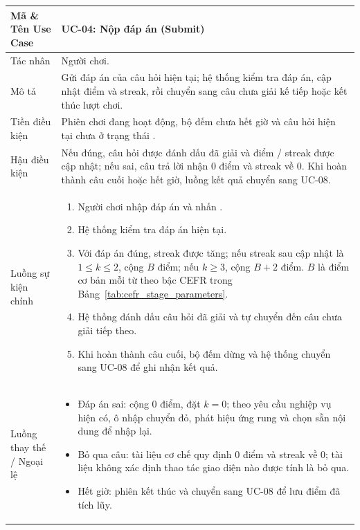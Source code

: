 \begin{xltabular}{\textwidth}{|L{3.3cm}|Y|}
\textbf{Mã \& Tên Use Case} & \textbf{UC-04: Nộp đáp án (Submit)} \\ \hline
Tác nhân & Người chơi. \\ \hline
Mô tả & Gửi đáp án của câu hỏi hiện tại; hệ thống kiểm tra đáp án, cập nhật điểm và streak, rồi chuyển sang câu chưa giải kế tiếp hoặc kết thúc lượt chơi. \\ \hline
Tiền điều kiện & Phiên chơi đang hoạt động, bộ đếm chưa hết giờ và câu hỏi hiện tại chưa ở trạng thái . \\ \hline
Hậu điều kiện & Nếu đúng, câu hỏi được đánh dấu đã giải và điểm / streak được cập nhật; nếu sai, câu trả lời nhận 0 điểm và streak về 0. Khi hoàn thành câu cuối hoặc hết giờ, luồng kết quả chuyển sang UC-08. \\ \hline
Luồng sự kiện chính &
\begin{enumerate}[nosep,leftmargin=*]
    \item Người chơi nhập đáp án và nhấn .
    \item Hệ thống kiểm tra đáp án hiện tại.
    \item Với đáp án đúng, streak được tăng; nếu streak sau cập nhật là \(1 \le k \le 2\), cộng \(B\) điểm; nếu \(k \ge 3\), cộng \(B+2\) điểm. \(B\) là điểm cơ bản mỗi từ theo bậc CEFR trong Bảng~\ref{tab:cefr_stage_parameters}.
    \item Hệ thống đánh dấu câu hỏi đã giải và tự chuyển đến câu chưa giải tiếp theo.
    \item Khi hoàn thành câu cuối, bộ đếm dừng và hệ thống chuyển sang UC-08 để ghi nhận kết quả.
\end{enumerate} \\ \hline
Luồng thay thế / Ngoại lệ &
\begin{itemize}[nosep,leftmargin=*]
    \item Đáp án sai: cộng 0 điểm, đặt \(k=0\); theo yêu cầu nghiệp vụ hiện có, ô nhập chuyển đỏ, phát hiệu ứng rung và chọn sẵn nội dung để nhập lại.
    \item Bỏ qua câu: tài liệu cơ chế quy định 0 điểm và streak về 0; tài liệu không xác định thao tác giao diện nào được tính là bỏ qua.
    \item Hết giờ: phiên kết thúc và chuyển sang UC-08 để lưu điểm đã tích lũy.
\end{itemize} \\ \hline


\end{xltabular}
